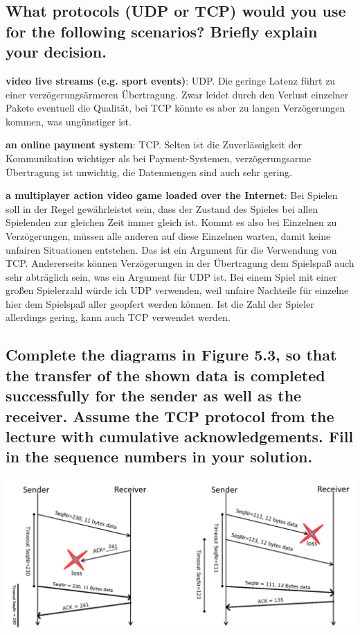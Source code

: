 \documentclass[a4paper,
			llpt,
			solution,
			accentcolor=tud2d,
			colorbacktitle
			]
			{tudexercise}
\begin{document}
\subsection{What protocols (UDP or TCP) would you use for the following scenarios? Briefly explain your decision.}
\begin{compactenum}
\item \textbf{video live streams (e.g. sport events)}: UDP. Die geringe Latenz führt zu einer verzögerungsärmeren Übertragung. Zwar leidet durch den Verlust einzelner Pakete eventuell die Qualität, bei TCP könnte es aber zu langen Verzögerungen kommen, was ungünstiger ist.
\item \textbf{an online payment system}: TCP. Selten ist die Zuverlässigkeit der Kommunikation wichtiger als bei Payment-Systemen, verzögerungsarme Übertragung ist unwichtig, die Datenmengen sind auch sehr gering.
\item \textbf{a multiplayer action video game loaded over the Internet}: Bei Spielen soll in der Regel gewährleistet sein, dass der Zustand des Spieles bei allen Spielenden zur gleichen Zeit immer gleich ist. Kommt es also bei Einzelnen zu Verzögerungen, müssen alle anderen auf diese Einzelnen warten, damit keine unfairen Situationen entstehen. Das ist ein Argument für die Verwendung von TCP. Andererseits können Verzögerungen in der Übertragung dem Spielspaß auch sehr abträglich sein, was ein Argument für UDP ist. Bei einem Spiel mit einer großen Spielerzahl würde ich UDP verwenden, weil unfaire Nachteile für einzelne hier dem Spielspaß aller geopfert werden können. Ist die Zahl der Spieler allerdings gering, kann auch TCP verwendet werden.
\end{compactenum}
\subsection{Complete the diagrams in Figure 5.3, so that the transfer of the shown data is completed successfully for the sender as well as the receiver. Assume the TCP protocol from the lecture with cumulative acknowledgements. Fill in the sequence numbers in your solution.}
\includegraphics[width=\textwidth]{haesslon.png}
\end{document}
